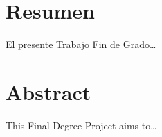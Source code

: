 \section*{Resumen}
El presente Trabajo Fin de Grado\dots
\vspace{1cm}

\section*{Abstract}
This Final Degree Project aims to\dots

\newpage